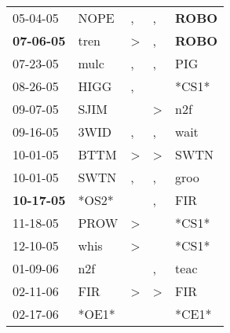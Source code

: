 \begin{supertabular}{p{0.07\textwidth}p{0.06\textwidth}p{0.02\textwidth}p{0.02\textwidth}p{0.06\textwidth}}
          05-04-05\textsuperscript{} &           NOPE\textsuperscript{} &                , &                , &  \textbf{ROBO\textsuperscript{}} \\
 \textbf{07-06-05\textsuperscript{}} &           tren\textsuperscript{} &     \textgreater &                , &  \textbf{ROBO\textsuperscript{}} \\
          07-23-05\textsuperscript{} &           mulc\textsuperscript{} &                , &                , &            PIG\textsuperscript{} \\
          08-26-05\textsuperscript{} &           HIGG\textsuperscript{} &                , &                  &                            *CS1* \\
          09-07-05\textsuperscript{} &           SJIM\textsuperscript{} &                  &     \textgreater &            n2f\textsuperscript{} \\
          09-16-05\textsuperscript{} &           3WID\textsuperscript{} &                , &                , &           wait\textsuperscript{} \\
          10-01-05\textsuperscript{} &           BTTM\textsuperscript{} &     \textgreater &     \textgreater &           SWTN\textsuperscript{} \\
          10-01-05\textsuperscript{} &           SWTN\textsuperscript{} &                , &                , &           groo\textsuperscript{} \\
 \textbf{10-17-05\textsuperscript{}} &                            *OS2* &                  &                , &            FIR\textsuperscript{} \\
          11-18-05\textsuperscript{} &           PROW\textsuperscript{} &     \textgreater &                  &                            *CS1* \\
          12-10-05\textsuperscript{} &           whis\textsuperscript{} &     \textgreater &                  &                            *CS1* \\
          01-09-06\textsuperscript{} &            n2f\textsuperscript{} &                  &                , &           teac\textsuperscript{} \\
          02-11-06\textsuperscript{} &            FIR\textsuperscript{} &     \textgreater &     \textgreater &            FIR\textsuperscript{} \\
          02-17-06\textsuperscript{} &                            *OE1* &                  &                  &                            *CE1* \\

\end{supertabular}
